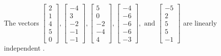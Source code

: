 \begin{exercise}
\begin{exerciseStatement}
  \end{exerciseStatement}
  \begin{exerciseAnswer}
   The vectors \(\left[\begin{array}{r}
2 \\
1 \\
4 \\
5 \\
0
\end{array}\right] , \left[\begin{array}{r}
-4 \\
3 \\
-2 \\
-1 \\
-1
\end{array}\right] , \left[\begin{array}{r}
5 \\
0 \\
-2 \\
-4 \\
4
\end{array}\right] , \left[\begin{array}{r}
-4 \\
-6 \\
-6 \\
-6 \\
-3
\end{array}\right] , \text{ and } \left[\begin{array}{r}
-5 \\
2 \\
5 \\
5 \\
-1
\end{array}\right]\) are 
  	 linearly independent  .
  


  \end{exerciseAnswer}
\end{exercise}